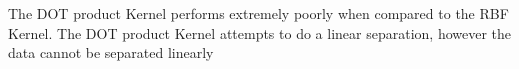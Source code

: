 \begin{answer}

The DOT product Kernel performs extremely poorly when compared to the RBF Kernel.
The DOT product Kernel attempts to do a linear separation, however the data cannot be separated linearly



\end{answer}
